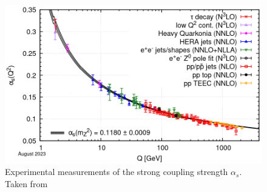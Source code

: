\begin{figure}[ht]
  \centering
  \includegraphics[width=.65\textwidth]{figures/running-coupling.png}
  \caption{Experimental measurements of the strong coupling strength $\alpha_s$. Taken from \cite{ParticleDataGroup:2024cfk}}
  \label{fig:running-coupling}
\end{figure}
